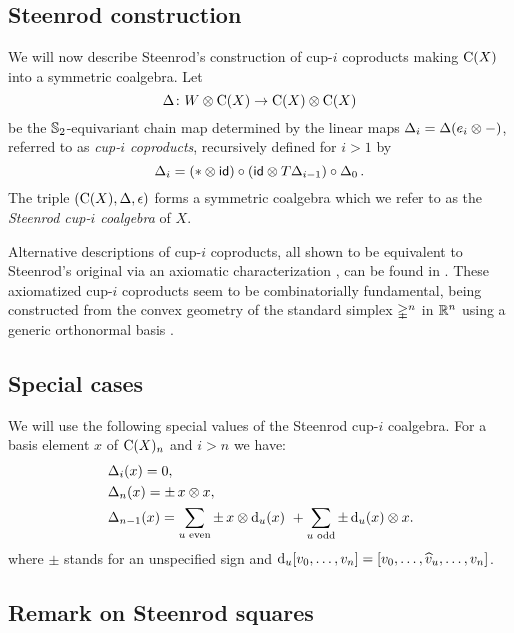 \subsection{Steenrod construction}\label{ss:cup-i}

We will now describe Steenrod's construction of cup-$i$ coproducts \cite[p.293]{steenrod1947products} making $\operatorname{C}(X)$ into a symmetric coalgebra.
Let
\[
\operatorname{\Delta} \colon W \otimes \operatorname{C}(X) \to \operatorname{C}(X) \otimes \operatorname{C}(X)
\]
be the $\mathbb{S}_2$-equivariant chain map determined by the linear maps $\operatorname{\Delta}_i = \operatorname{\Delta}(e_i \otimes -)$, referred to as \textit{cup-$i$ coproducts}, recursively defined for $i > 1$ by
\begin{equation*}\label{e:cup-i coproducts}
	\operatorname{\Delta}_i =
	(\ast \otimes \mathsf{id}) \circ (\mathsf{id} \otimes T\!\operatorname{\Delta}_{i-1}) \circ \operatorname{\Delta}_0.
\end{equation*}
The triple $(\operatorname{C}(X), \operatorname{\Delta}, \operatorname{\epsilon})$ forms a symmetric coalgebra which we refer to as the \textit{Steenrod cup-$i$ coalgebra} of $X$.

Alternative descriptions of cup-$i$ coproducts, all shown to be equivalent to Steenrod's original via an axiomatic characterization \cite{medina2022axiomatic}, can be found in \cite{real1996computability, gonzalez-diaz1999steenrod, mcclure2003multivariable, medina2021fast_sq}.
These axiomatized cup-$i$ coproducts seem to be combinatorially fundamental, being constructed from the convex geometry of the standard simplex $\mathbb{\Delta}^n$ in $\mathbb{R}^n$ using a generic orthonormal basis \cite{medina2022fib_poly}.

\subsection{Special cases}\label{ss:special_cases}

We will use the following special values of the Steenrod cup-$i$ coalgebra.
For a basis element $x$ of $\operatorname{C}(X)_n$ and $i > n$ we have:
\begin{align}
	&\operatorname{\Delta}_i(x) = 0, \\
	&\operatorname{\Delta}_n(x) = \pm \, x \otimes x, \\
	&\operatorname{\Delta}_{n-1}(x) =
	\sum_{u \text{ even}} \pm \, x \otimes \operatorname{d}_u(x) \ +
	\sum_{u \text{ odd}} \pm \operatorname{d}_u(x) \otimes x.
\end{align}
where $\pm$ stands for an unspecified sign and $\operatorname{d}_u [v_0,\dots,v_n] = [v_0,\dots,\widehat{v}_u,\dots,v_n]$.

\subsection{Remark on Steenrod squares}\label{ss:steenrod squares}

